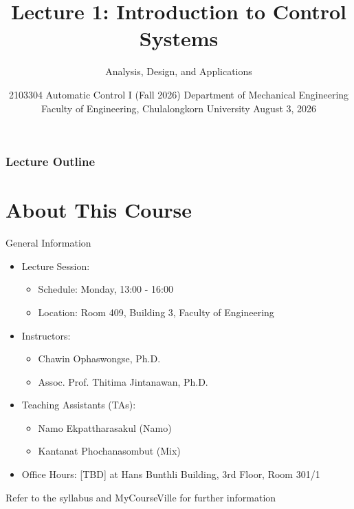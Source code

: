 \documentclass[12pt, aspectratio=169]{beamer}
\title[Lecture 1: Introduction to Control Systems] %
{\textbf{Lecture 1: Introduction to Control Systems}}
\subtitle{Analysis, Design, and Applications}
\date[Mech. Eng., Chulalongkorn University] %
{2103304 Automatic Control I (Fall 2026) \newline \newline Department of Mechanical Engineering 
\newline Faculty of Engineering, Chulalongkorn University
\newline \newline August 3, 2026}
\begin{document}
\maketitle

\begin{frame}
\frametitle{Lecture Outline}
\tableofcontents
\end{frame}
\section{About This Course}


\begin{frame}{General Information}
    \begin{itemize}
        \item Lecture Session:
        \begin{itemize}
            \item Schedule: Monday, 13:00 - 16:00
            \item Location: Room 409, Building 3, Faculty of Engineering
        \end{itemize}
        \item Instructors: 
        \begin{itemize}
            \item Chawin Ophaswongse, Ph.D. %
            \item Assoc. Prof. Thitima Jintanawan, Ph.D. %
        \end{itemize}
        \item Teaching Assistants (TAs):
        \begin{itemize}
            \item Namo Ekpattharasakul (Namo)
            \item Kantanat Phochanasombut (Mix)
        \end{itemize}
        \item Office Hours: [TBD] at Hans Bunthli Building, 3rd Floor, Room 301/1
    \end{itemize}
    \begin{center}
        \alert{Refer to the syllabus and MyCourseVille for further information}
    \end{center}
\end{frame}
\end{document}
